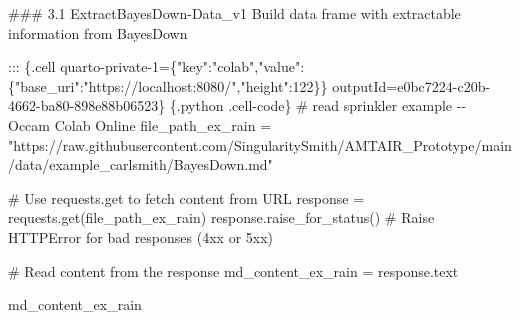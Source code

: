\documentclass[
  11pt,
  letterpaper,
]{book}
\newenvironment{Shaded}{\begin{snugshade}}{\end{snugshade}}
\newcommand{\DataTypeTok}[1]{\textcolor[rgb]{0.68,0.00,0.00}{#1}}
\newcommand{\DecValTok}[1]{\textcolor[rgb]{0.68,0.00,0.00}{#1}}
\newcommand{\ErrorTok}[1]{\textcolor[rgb]{0.68,0.00,0.00}{#1}}
\newcommand{\FunctionTok}[1]{\textcolor[rgb]{0.28,0.35,0.67}{#1}}
\newcommand{\StringTok}[1]{\textcolor[rgb]{0.13,0.47,0.30}{#1}}
\begin{document}
\begin{Shaded}
\begin{Highlighting}[]
\ErrorTok{\#\#\#} \ErrorTok{3.1} \ErrorTok{ExtractBayesDown{-}Data\_v1}
\ErrorTok{Build} \ErrorTok{data} \ErrorTok{frame} \ErrorTok{with} \ErrorTok{extractable} \ErrorTok{information} \ErrorTok{from} \ErrorTok{BayesDown}

\ErrorTok{:::} \FunctionTok{\{}\ErrorTok{.cell} \ErrorTok{quarto{-}private{-}1=\textquotesingle{}\{}\DataTypeTok{"key"}\FunctionTok{:}\StringTok{"colab"}\FunctionTok{,}\DataTypeTok{"value"}\FunctionTok{:\{}\DataTypeTok{"base\_uri"}\FunctionTok{:}\StringTok{"https://localhost:8080/"}\FunctionTok{,}\DataTypeTok{"height"}\FunctionTok{:}\DecValTok{122}\FunctionTok{\}\}}\ErrorTok{\textquotesingle{}} \ErrorTok{outputId=\textquotesingle{}e0bc7224{-}c20b{-}4662{-}ba80{-}898e88b06523\textquotesingle{}\}}
\ErrorTok{\textasciigrave{}\textasciigrave{}\textasciigrave{}} \FunctionTok{\{}\ErrorTok{.python} \ErrorTok{.cell{-}code}\FunctionTok{\}}
\ErrorTok{\#} \ErrorTok{read} \ErrorTok{sprinkler} \ErrorTok{example} \ErrorTok{{-}{-}} \ErrorTok{Occam} \ErrorTok{Colab} \ErrorTok{Online}
\ErrorTok{file\_path\_ex\_rain} \ErrorTok{=} \ErrorTok{"https://raw.githubusercontent.com/SingularitySmith/AMTAIR\_Prototype/main/data/example\_carlsmith/BayesDown.md"}

\ErrorTok{\#} \ErrorTok{Use} \ErrorTok{requests.get} \ErrorTok{to} \ErrorTok{fetch} \ErrorTok{content} \ErrorTok{from} \ErrorTok{URL}
\ErrorTok{response} \ErrorTok{=} \ErrorTok{requests.get(file\_path\_ex\_rain)}
\ErrorTok{response.raise\_for\_status()}  \ErrorTok{\#} \ErrorTok{Raise} \ErrorTok{HTTPError} \ErrorTok{for} \ErrorTok{bad} \ErrorTok{responses} \ErrorTok{(4xx} \ErrorTok{or} \ErrorTok{5xx)}

\ErrorTok{\#} \ErrorTok{Read} \ErrorTok{content} \ErrorTok{from} \ErrorTok{the} \ErrorTok{response}
\ErrorTok{md\_content\_ex\_rain} \ErrorTok{=} \ErrorTok{response.text}

\ErrorTok{md\_content\_ex\_rain}
\end{Highlighting}
\end{Shaded}
\end{document}
